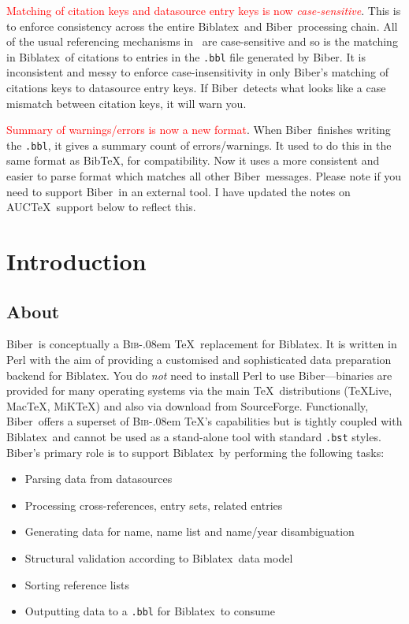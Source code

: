 \documentclass{ltxdockit}
\def\BibTeX{\textsc{Bib}\kern-.08em \TeX}
\newcommand*{\biber}{Biber\xspace}
\newcommand*{\biblatex}{Biblatex\xspace}
\begin{document}
\textcolor{red}{Matching of citation keys and datasource entry keys is now
  \emph{case-sensitive}}. This is to enforce consistency across the entire
\biblatex\ and \biber\ processing chain. All of the usual referencing
mechanisms in \latex\ are case-sensitive and so is the matching in
\biblatex\ of citations to entries in the \texttt{.bbl} file generated by
\biber. It is inconsistent and messy to enforce case-insensitivity in only
\biber's matching of citations keys to datasource entry keys. If \biber\
detects what looks like a case mismatch between citation keys, it will warn
you.

\noindent \textcolor{red}{Summary of warnings/errors is now a new format}.
When \biber\ finishes writing the \verb+.bbl+, it gives a summary
count of errors/warnings. It used to do this in the same format as
Bib\TeX, for compatibility. Now it uses a more consistent and easier
to parse format which matches all other \biber\ messages. Please note
if you need to support \biber\ in an external tool. I have updated the
notes on AUC\TeX\ support below to reflect this.

\section{Introduction}\label{int}

\subsection{About}

\biber\ is conceptually a \BibTeX\ replacement for
\biblatex. It is written in Perl with the aim of providing a
customised and sophisticated data preparation backend for \biblatex.
You do \emph{not} need to install Perl to use \biber---binaries
are provided for many operating systems via the main \TeX\
distributions (\TeX Live, Mac\TeX, MiK\TeX) and also via download from SourceForge.
Functionally, \biber\ offers a superset of \BibTeX's capabilities but is
tightly coupled with \biblatex\ and cannot be used as a stand-alone tool
with standard \verb+.bst+ styles. \biber's primary role is to support
\biblatex\ by performing the following tasks:

\begin{itemize}
\item Parsing data from datasources
\item Processing cross-references, entry sets, related entries
\item Generating data for name, name list and name/year disambiguation
\item Structural validation according to \biblatex\ data model
\item Sorting reference lists
\item Outputting data to a \verb+.bbl+ for \biblatex\ to consume
\end{itemize}
\end{document}
